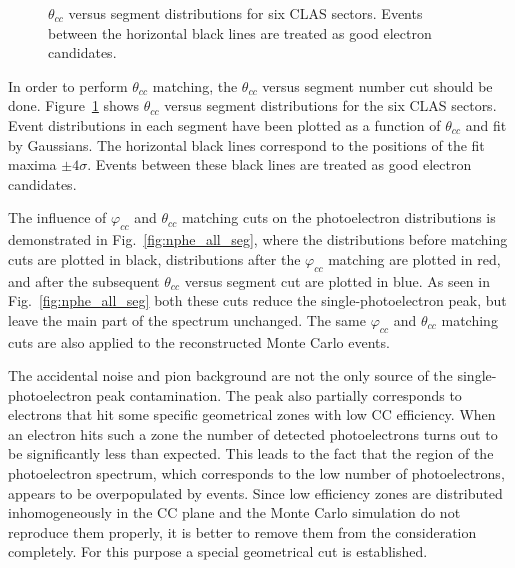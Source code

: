 \begin{figure}[htp]
\begin{center}
\caption{\small  $\theta_{cc}$ versus segment distributions for six CLAS sectors. Events between the horizontal black lines are treated as good electron candidates.} \label{fig:th_vs_seg}
\end{center}
\end{figure}%


In order to perform $\theta_{cc}$ matching, the $\theta_{cc}$ versus segment number cut should be done. Figure~\ref{fig:th_vs_seg} shows $\theta_{cc}$ versus segment distributions for the six CLAS sectors. Event distributions in each segment have been plotted as a function of $\theta_{cc}$ and fit by Gaussians. The horizontal black lines correspond to the positions of the fit maxima $\pm4\sigma$. Events between these black lines are treated as good electron candidates.


The influence of $\varphi_{cc}$ and $\theta_{cc}$ matching cuts on the photoelectron distributions is demonstrated in Fig.~\ref{fig:nphe_all_seg}, where the distributions before matching cuts are plotted in black, distributions after the $\varphi_{cc}$ matching are plotted in red, and after the subsequent $\theta_{cc}$ versus segment cut are plotted in blue. As seen in Fig.~\ref{fig:nphe_all_seg} both these cuts reduce the single-photoelectron peak, but leave the main part of the spectrum unchanged. The same $\varphi_{cc}$ and $\theta_{cc}$ matching cuts are also applied to the reconstructed Monte Carlo events.


The accidental noise and pion background are not the only source of the single-photoelectron peak contamination. The peak also partially corresponds to electrons that hit some specific geometrical zones with low CC efficiency. When an electron hits such a zone the number of detected photoelectrons turns out to be significantly less than expected. This leads to the fact that the region of the photoelectron spectrum, which corresponds to the low number of photoelectrons, appears to be overpopulated by events. Since low efficiency zones are distributed inhomogeneously in the CC plane and the Monte Carlo simulation do not reproduce them properly, it is better to remove them from the consideration completely. For this purpose  a special geometrical cut is established. 


